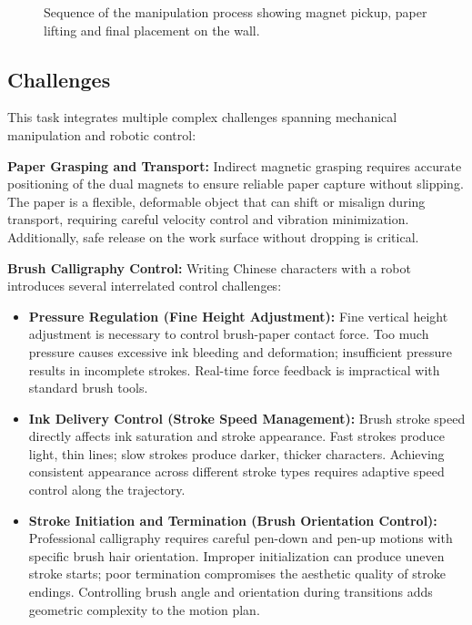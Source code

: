 \documentclass[11pt]{article}
\begin{document}
\begin{figure}[H]
\centering
\fbox{\rule{0pt}{5cm}\rule{10cm}{0pt}}
\caption{Sequence of the manipulation process showing magnet pickup, paper lifting and final placement on the wall.}
\end{figure}

\subsection{Challenges}

This task integrates multiple complex challenges spanning mechanical manipulation and robotic control:

\textbf{Paper Grasping and Transport:} Indirect magnetic grasping requires accurate positioning of the dual magnets to ensure reliable paper capture without slipping. The paper is a flexible, deformable object that can shift or misalign during transport, requiring careful velocity control and vibration minimization. Additionally, safe release on the work surface without dropping is critical.

\textbf{Brush Calligraphy Control:} Writing Chinese characters with a robot introduces several interrelated control challenges:

\begin{itemize}
\item \textbf{Pressure Regulation (Fine Height Adjustment):} Fine vertical height adjustment is necessary to control brush-paper contact force. Too much pressure causes excessive ink bleeding and deformation; insufficient pressure results in incomplete strokes. Real-time force feedback is impractical with standard brush tools.

\item \textbf{Ink Delivery Control (Stroke Speed Management):} Brush stroke speed directly affects ink saturation and stroke appearance. Fast strokes produce light, thin lines; slow strokes produce darker, thicker characters. Achieving consistent appearance across different stroke types requires adaptive speed control along the trajectory.

\item \textbf{Stroke Initiation and Termination (Brush Orientation Control):} Professional calligraphy requires careful pen-down and pen-up motions with specific brush hair orientation. Improper initialization can produce uneven stroke starts; poor termination compromises the aesthetic quality of stroke endings. Controlling brush angle and orientation during transitions adds geometric complexity to the motion plan.
\end{itemize}
\end{document}
